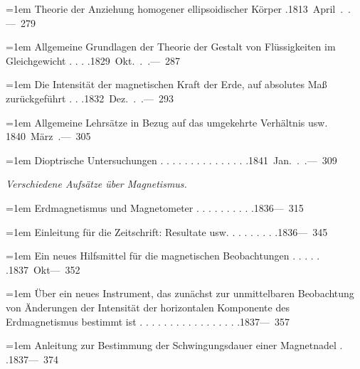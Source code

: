 \noindent\hangindent=1em Theorie der Anziehung homogener ellipsoidischer Körper .\unskip\hspace{1em plus 1fill}\mbox{1813 April . .\quad — 279}\par\smallskip
\noindent\hangindent=1em Allgemeine Grundlagen der Theorie der Gestalt von Flüssigkeiten im Gleichgewicht . . . .\unskip\hspace{1em plus 1fill}\mbox{1829 Okt. . .\quad — 287}\par\smallskip
\noindent\hangindent=1em Die Intensität der magnetischen Kraft der Erde, auf absolutes Maß zurückgeführt . . .\unskip\hspace{1em plus 1fill}\mbox{1832 Dez. . .\quad — 293}\par\smallskip
\noindent\hangindent=1em Allgemeine Lehrsätze in Bezug auf das umgekehrte Verhältnis usw. \unskip\hspace{1em plus 1fill}\mbox{1840 März .\quad — 305}\par\smallskip
\noindent\hangindent=1em Dioptrische Untersuchungen . . . . . . . . . . . . . . .\unskip\hspace{1em plus 1fill}\mbox{1841 Jan. . .\quad — 309}\par\smallskip
\par{}\medskip\noindent\textit{Verschiedene Aufsätze über Magnetismus.}\par\smallskip
\noindent\hangindent=1em Erdmagnetismus und Magnetometer . . . . . . . . . .\unskip\hspace{1em plus 1fill}\mbox{1836\quad — 315}\par\smallskip
\noindent\hangindent=1em Einleitung für die Zeitschrift: Resultate usw. . . . . . . . .\unskip\hspace{1em plus 1fill}\mbox{1836\quad — 345}\par\smallskip
\noindent\hangindent=1em Ein neues Hilfsmittel für die magnetischen Beobachtungen . . . . . .\unskip\hspace{1em plus 1fill}\mbox{1837 Okt\quad — 352}\par\smallskip
\noindent\hangindent=1em Über ein neues Instrument, das zunächst zur unmittelbaren Beobachtung von Änderungen der Intensität der horizontalen Komponente des Erdmagnetismus bestimmt ist . . . . . . . . . . . . . . . . .\unskip\hspace{1em plus 1fill}\mbox{1837\quad — 357}\par\smallskip
\noindent\hangindent=1em Anleitung zur Bestimmung der Schwingungsdauer einer Magnetnadel . .\unskip\hspace{1em plus 1fill}\mbox{1837\quad — 374}\par\smallskip
